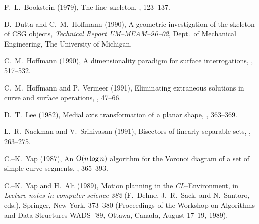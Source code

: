 \begin{thebibliography}{99}

F.~L.~Bookstein (1979), The line--skeleton, , 123--137.

D.~Dutta and C.~M.~Hoffmann (1990), A geometric investigation of the
skeleton of CSG objects, {\it Technical Report UM--MEAM--90--02},
Dept.\ of Mechanical Engineering, The University of Michigan.

C.~M.~Hoffmann (1990), A dimensionality paradigm for surface interrogations,
, 517--532.

C.~M.~Hoffmann and P.~Vermeer (1991), Eliminating extraneous solutions in
curve and surface operations, , 47--66.

D.~T.~Lee (1982), Medial axis transformation of a planar shape,
, 363--369.

L.~R.~Nackman and V.~Srinivasan (1991), Bisectors of linearly separable
sets, , 263--275.

C.--K.~Yap (1987), An ${\rm O}(n\log n)$ algorithm for the Voronoi
diagram of a set of simple curve segments, , 365--393.

C.--K.~Yap and H.~Alt (1989), Motion planning in the {\it
CL\/}--Environment, in {\it Lecture notes in computer science 382\/}
(F.~Dehne, J.--R.~Sack, and N.~Santoro, eds.), Springer, New York,
373--380 (Proceedings of the Workshop on Algorithms and Data
Structures WADS~'89, Ottawa, Canada, August 17--19, 1989).

\end{thebibliography}

